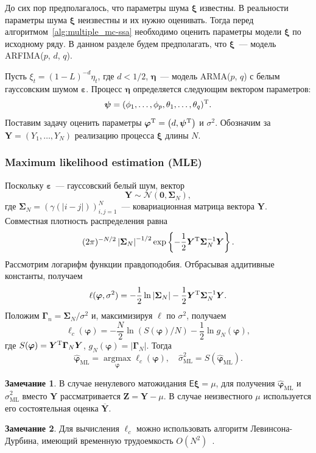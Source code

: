 \documentclass[specialist,
substylefile = spbu_report.rtx,
subf,12pt]{disser}
\theoremstyle{definition}
\newtheorem{remark}{Замечание}[chapter]
\begin{document}
До сих пор предполагалось, что параметры шума $\bm\xi$ известны. В реальности параметры шума $\bm\xi$ неизвестны и их нужно оценивать. Тогда перед алгоритмом~\ref{alg:multiple_mc-ssa} необходимо оценить параметры модели $\bm\xi$ по исходному ряду. В данном разделе будем предполагать, что $\bm\xi$~--- модель ARFIMA($p$, $d$, $q$).

Пусть $\xi_t=(1-L)^{-d}\eta_t$, где $d<1/2$, $\bm\eta$~--- модель ARMA($p$, $q$) с белым гауссовским шумом $\bm\varepsilon$. Процесс $\bm\eta$ определяется следующим вектором параметров:
\[
\bm\psi=(\phi_1,\ldots,\phi_p,\theta_1,\ldots,\theta_q)^{\mathrm{T}}.
\]
Поставим задачу оценить параметры $\bm\varphi^{\mathrm{T}}=\left(d, \bm\psi^{\mathrm{T}}\right)$ и $\sigma^2$. Обозначим за $\bm{Y}=(Y_1,\ldots, Y_N)$ реализацию процесса $\bm\xi$ длины $N$.

\subsubsection{Maximum likelihood estimation (MLE)}

Поскольку $\bm\varepsilon$~--- гауссовский белый шум, вектор
\[
	\bm{Y} \sim \mathcal{N}(\bm0, \bm\Sigma_N),
\]
где $\bm\Sigma_N=(\gamma(|i-j|))_{i,j=1}^N$~--- ковариационная матрица вектора $\bm Y$. Совместная плотность распределения равна
\[
	(2\pi)^{-N/2} \left| \bm\Sigma_N \right|^{-1/2} \exp\left\{-\frac12 \bm{Y}^{\mathrm{T}} \bm\Sigma_N^{-1} \bm{Y}\right\}.
\]
Рассмотрим логарифм функции правдоподобия. Отбрасывая аддитивные константы, получаем
\[
	\ell(\bm\varphi, \sigma^2)=-\frac12 \ln\left|\bm{\Sigma}_N\right| - \frac12 \bm{Y}^{\mathrm{T}} \bm\Sigma_N^{-1} \bm{Y}.
\]
Положим $\bm\Gamma_n=\bm\Sigma_N / \sigma^2$ и, максимизируя $\ell$ по $\sigma^2$, получаем
\begin{equation}\label{eq:mle_objective}
	\ell_c(\bm\varphi)=-\frac{N}{2}\ln\left(S(\bm\varphi) / N\right) - \frac{1}{2}\ln g_N(\bm\varphi),
\end{equation}
где $S(\bm\varphi)=\bm Y^{\mathrm{T}} \bm\Gamma_N \bm Y$, $g_N(\bm\varphi)=\left|\bm\Gamma_N\right|$.
Тогда
\[
	\widehat{\bm\varphi}_\mathrm{ML}=\operatorname*{argmax}\limits_{\bm\varphi}\ell_c(\bm\varphi),\quad \widehat\sigma^2_\mathrm{ML} = S(\widehat{\bm\varphi}_\mathrm{ML}).
\]

\begin{remark}
	В случае ненулевого матожидания $\mathsf{E}\bm\xi=\mu$, для получения $\widehat{\bm\varphi}_\mathrm{ML}$ и $\widehat\sigma^2_\mathrm{ML}$ вместо $\bm Y$ рассматривается $\bm Z=\bm Y-\mu$. В случае неизвестного $\mu$ используется его состоятельная оценка $\overline{\bm{Y}}$.
\end{remark}
\begin{remark}
	Для вычисления $\ell_c$ можно использовать алгоритм Левинсона-Дурбина, имеющий временную трудоемкость $O(N^2)$~\cite{McLeod2007}.
\end{remark}
\end{document}
